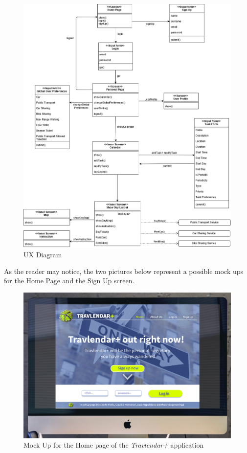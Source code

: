 \begin{figure}[H]
    \centering
    \includegraphics[scale=0.4]{Pictures/UXDiagram/UXDiagram.png}
    \caption{UX Diagram}
\end{figure}

As the reader may notice, the two pictures below represent a possible mock ups for the Home Page and the Sign Up screen.

\begin{figure}[H]
    \centering
    \includegraphics[scale=0.2]{Pictures/UXDiagram/desktopMockUpHome.png}
    \caption{Mock Up for the Home page of the \emph{Travlendar+} application}
    \label{fig:homePageMockUp}
\end{figure}

